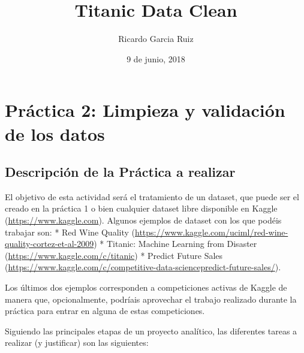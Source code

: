 \documentclass[]{article}
\title{Titanic Data Clean}
\author{Ricardo Garcia Ruiz}
\date{9 de junio, 2018}
\begin{document}
\maketitle

{
\setcounter{tocdepth}{3}
\tableofcontents
}
\section{Práctica 2: Limpieza y validación de los
datos}\label{practica-2-limpieza-y-validacion-de-los-datos}

\subsection{Descripción de la Práctica a
realizar}\label{descripcion-de-la-practica-a-realizar}

El objetivo de esta actividad será el tratamiento de un dataset, que
puede ser el creado en la práctica 1 o bien cualquier dataset libre
disponible en Kaggle (\url{https://www.kaggle.com}). Algunos ejemplos de
dataset con los que podéis trabajar son: * Red Wine Quality
(\url{https://www.kaggle.com/uciml/red-wine-quality-cortez-et-al-2009})
* Titanic: Machine Learning from Disaster
(\url{https://www.kaggle.com/c/titanic}) * Predict Future Sales
(\url{https://www.kaggle.com/c/competitive-data-sciencepredict-future-sales/}).

Los últimos dos ejemplos corresponden a competiciones activas de Kaggle
de manera que, opcionalmente, podríais aprovechar el trabajo realizado
durante la práctica para entrar en alguna de estas competiciones.

Siguiendo las principales etapas de un proyecto analítico, las
diferentes tareas a realizar (y justificar) son las siguientes:
\end{document}
